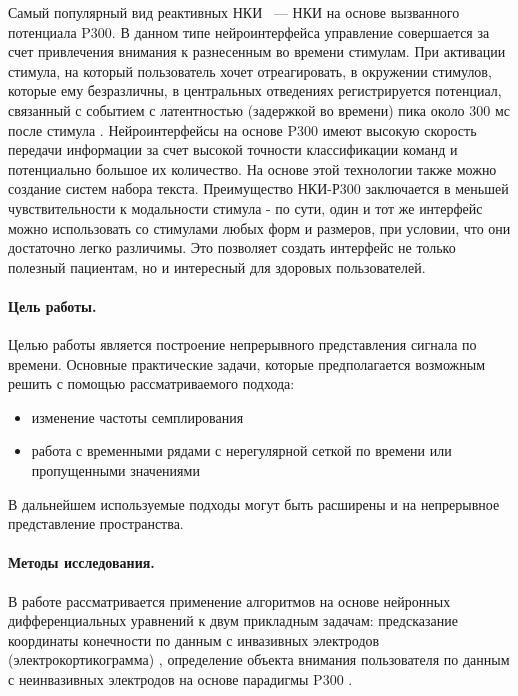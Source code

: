 \documentclass[12pt]{article}
\begin{document}
Самый популярный вид реактивных НКИ ~--- НКИ на основе вызванного потенциала P300. В данном типе нейроинтерфейса управление совершается за счет привлечения внимания к разнесенным во времени стимулам. При активации стимула, на который пользователь хочет отреагировать, в окружении стимулов, которые ему безразличны, в центральных отведениях регистрируется потенциал, связанный с событием с латентностью (задержкой во времени) пика около 300 мс после стимула \cite{polich2007updating}. Нейроинтерфейсы на основе P300 имеют высокую скорость передачи информации за счет высокой точности классификации команд и потенциально большое их количество. На основе этой технологии также можно создание систем набора текста. Преимущество НКИ-Р300 заключается в меньшей чувствительности к модальности стимула - по сути, один и тот же интерфейс можно использовать со стимулами любых форм и размеров, при условии, что они достаточно легко различимы. Это позволяет создать интерфейс не только полезный пациентам, но и интересный для здоровых пользователей. 
    


\paragraph{Цель работы.}

Целью работы является построение непрерывного представления сигнала по времени. Основные практические задачи, которые предполагается возможным решить с помощью рассматриваемого подхода:
\begin{itemize}
    \item изменение частоты семплирования
    \item работа с временными рядами с нерегулярной сеткой по времени или пропущенными значениями
\end{itemize}


В дальнейшем используемые подходы могут быть расширены и на непрерывное представление пространства.


\paragraph{Методы исследования.}



В работе рассматривается применение алгоритмов на основе нейронных дифференциальных уравнений к двум прикладным задачам: предсказание координаты конечности по данным с инвазивных электродов (электрокортикограмма) \cite{neurotycho}, определение объекта внимания пользователя по данным с неинвазивных электродов на основе парадигмы P300 \cite{sth about P300}.
\end{document}
